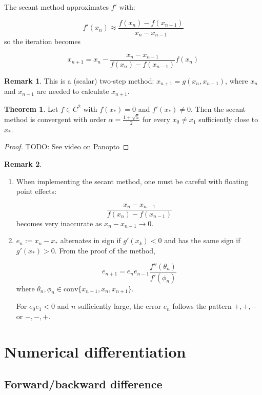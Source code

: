 \documentclass[12pt,a4paper]{article}
\theoremstyle{definition}
\newtheorem{theorem}[definition]{Theorem}
\newtheorem*{remark}{Remark}
\begin{document}
The secant method approximates $f'$ with:

\[ f'(x_n) \approx \frac{f(x_n) - f(x_{n - 1})}{x_n - x_{n - 1}} \]
so the iteration becomes

\[ x_{n + 1} = x_n - \frac{x_n - x_{n - 1}}{f(x_n) - f(x_{n - 1})} f(x_n) \]

\begin{remark}
	This is a (scalar) two-step method: $x_{n + 1} = g(x_n, x_{n - 1})$, where $x_n$ and $x_{n - 1}$ are needed to calculate $x_{n + 1}$.
\end{remark}

\begin{theorem}
	Let $f \in C^2$ with $f(x_*) = 0$ and $f'(x_*) \ne 0$. Then the secant method is convergent with order $\alpha = \frac{1 + \sqrt{5}}{2}$ for every $x_0 \ne x_1$ sufficiently close to $x_*$.
\end{theorem}

\begin{proof}
	TODO: See video on Panopto
\end{proof}

\begin{remark}
	\hfill
	\begin{enumerate}
		\item When implementing the secant method, one must be careful with floating point effects:

		\[ \frac{x_n - x_{n - 1}}{f(x_n) - f(x_{n - 1})} \]
		becomes very inaccurate as $x_n - x_{n - 1} \rightarrow 0$.
		\item $e_n := x_n - x_*$ alternates in sign if $g'(x_k) < 0$ and has the same sign if $g'(x_*) > 0$. From the proof of the method,
		
		\[ e_{n + 1} = e_n e_{n - 1} \frac{f''(\theta_n)}{f'(\phi_n)} \]
		where $\theta_n, \phi_n \in \text{conv} \{x_{n - 1}, x_n, x_{n + 1} \}$.

		For $e_0 e_1 < 0$ and $n$ sufficiently large, the error $e_n$ follows the pattern $+,+,-$ or $-,-,+$.
	\end{enumerate}
\end{remark}

\clearpage
\section{Numerical differentiation}

\subsection{Forward/backward difference}
\end{document}
